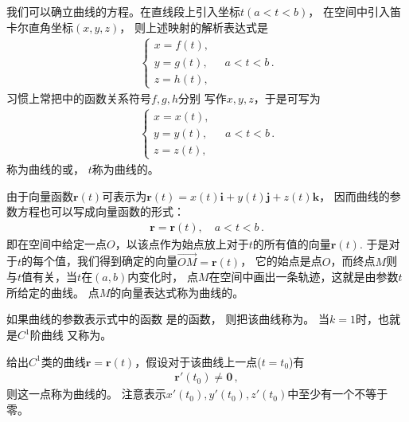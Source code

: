 我们可以确立曲线的方程。在直线段上引入坐标$t(a<t<b)$，
在空间中引入笛卡尔直角坐标$(x,y,z)$，
则上述映射的解析表达式是
\begin{align}\label{eq:03ex01.1}
    \left\{\begin{array}{c}
        x=f(t), \\
        y=g(t), \\
        z=h(t),
    \end{array}
    \right.\quad a<t<b\, .
\end{align}
习惯上常把中的函数关系符号$f,g,h$分别
写作$x,y,z$，于是可写为
\begin{align}\label{eq:03ex01.2}
    \left\{\begin{array}{c}
        x=x(t), \\
        y=y(t), \\
        z=z(t),
    \end{array}
    \right.\quad a<t<b\, .
\end{align}
称为曲线的或，
$t$称为曲线的。

由于向量函数$\bm r(t)$可表示为$\bm r(t)=x(t)\mathbf{i}+y(t)\mathbf{j}+z(t)\mathbf{k}$，
因而曲线的参数方程也可以写成向量函数的形式：
\begin{align}\label{eq:03ex01.3}
    \bm r=\bm r(t),\quad a<t<b\, .
\end{align}
即在空间中给定一点$O$，以该点作为始点放上对于$t$的所有值的向量$\bm r(t)$.
于是对于$t$的每个值，我们得到确定的向量$\overrightarrow{OM}=\bm r(t)$，
它的始点是点$O$，而终点$M$则与$t$值有关，当$t$在$(a,b)$内变化时，
点$M$在空间中画出一条轨迹，这就是由参数$t$所给定的曲线。
点$M$的向量表达式称为曲线的。

\begin{definition}
    如果曲线的参数表示式中的函数
    是的函数，
    则把该曲线称为。
    当$k=1$时，也就是$C^1$阶曲线
    又称为。
\end{definition}

\begin{definition}
    给出$C^1$类的曲线$\bm r=\bm r(t)$，假设对于该曲线上一点($t=t_0$)有
    \begin{align}\label{eq:03ex01.4}
        \bm r'(t_0)\neq \bm 0\, ,
    \end{align}
    则这一点称为曲线的。
    注意表示$x'(t_0),y'(t_0),z'(t_0)$中至少有一个不等于零。
\end{definition}

